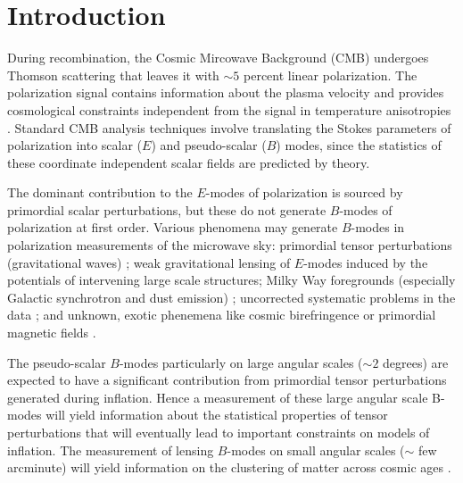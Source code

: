 \section{Introduction}
During recombination, the Cosmic Mircowave Background (CMB) undergoes Thomson scattering that leaves it with $\sim 5$ percent linear polarization.  The polarization signal contains information about the plasma velocity and provides cosmological constraints independent from the signal in temperature anisotropies \citep{1997NewA....2..323H}.  Standard CMB analysis techniques involve translating the Stokes parameters of polarization into scalar ($E$) and pseudo-scalar ($B$) modes, since the statistics of these coordinate independent scalar fields are predicted by theory.   

The dominant contribution to the $E$-modes of polarization is sourced by primordial scalar perturbations, but these do not generate $B$-modes of polarization at first order. Various phenomena may generate $B$-modes in polarization measurements of the microwave sky:
primordial tensor perturbations (gravitational waves)%
\citep{1997PhRvD..56..596H,1997PhRvL..78.2054S};
weak gravitational lensing of $E$-modes induced by the potentials of intervening large scale structures;
Milky Way foregrounds (especially Galactic synchrotron and dust emission)
\citep{2016A&A...586A.133P};
uncorrected systematic problems in the data \citep{2003PhRvD..67d3004H,2008PhRvD..77h3003S};
and unknown, exotic phenemena like cosmic birefringence or primordial magnetic fields
\citep{1996ApJ...469....1K,1999PhRvL..83.1506L,2004ApJ...616....1C,2014MNRAS.438.2508P}.

The pseudo-scalar $B$-modes particularly on large angular scales ($\sim 2$ degrees) are expected to have a significant contribution from primordial tensor perturbations generated during inflation. Hence a measurement of these large angular scale B-modes will yield information about the statistical properties of tensor perturbations that will eventually lead to important constraints on models of inflation.  The measurement of lensing $B$-modes on small angular scales ($\sim$ few arcminute) will yield information on the clustering of matter across cosmic ages \citep{Abazajian2015, Kamionkowski2016,Abazajian2016,Hu2002c,Wehus2016}.
  

